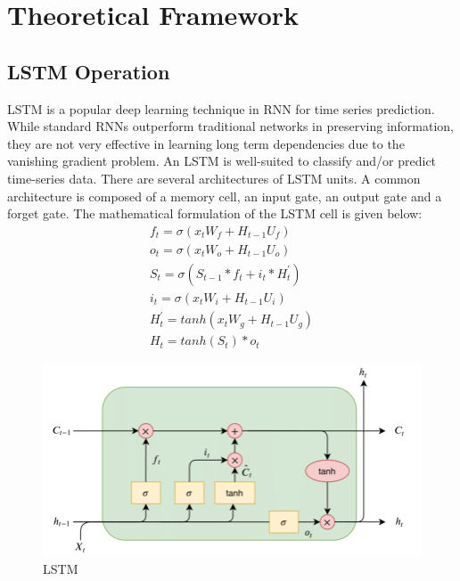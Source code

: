 \chapter{Theoretical Framework}
\vspace{-18pt}
\section{LSTM Operation}
\vspace{-18pt}
LSTM is a popular deep learning technique in RNN for time series prediction. While standard RNNs outperform traditional networks in preserving information, they are not very effective in learning long term dependencies due to the vanishing gradient problem. An LSTM is well-suited to classify and/or predict time-series data. There are several architectures of LSTM units. A common architecture is composed of a memory cell, an input gate, an output gate and a forget gate. The mathematical formulation of the LSTM cell is given below:
\begin{eqnarray}
	f_t = \sigma(x_tW_f + H_{t-1}U_f)\\
	o_t = \sigma(x_tW_o + H_{t-1}U_o)\\
	S_t = \sigma(S_{t-1} *f_t + i_t * H^{'}_t)\\
	i_t = \sigma(x_tW_i + H_{t-1}U_i)\\
	H^{'}_t = tanh(x_tW_g + H_{t-1}U_g)\\
	H_t = tanh(S_t)*o_t
\end{eqnarray}
\begin{figure}[tbh] %
	\begin{center}
		\includegraphics[width=5in]{images/lstmmod.png} 
		\caption{LSTM} %
		\label{LSTM} %
	\end{center}
\end{figure}
\newpage
